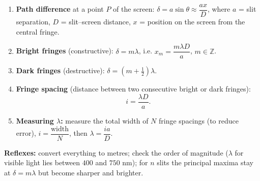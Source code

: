 \documentclass[11pt]{article}
\begin{document}
\begin{methode}
\begin{enumerate}
\item \textbf{Path difference} at a point $P$ of the screen: $\delta = a\sin\theta \approx \dfrac{ax}{D}$, where $a$ = slit separation, $D$ = slit--screen distance, $x$ = position on the screen from the central fringe.
\item \textbf{Bright fringes} (constructive): $\delta = m\lambda$, i.e. $x_m=\dfrac{m\lambda D}{a}$, $m\in\mathbb{Z}$.
\item \textbf{Dark fringes} (destructive): $\delta = \left(m+\tfrac12\right)\lambda$.
\item \textbf{Fringe spacing} (distance between two consecutive bright or dark fringes):
\[
i=\frac{\lambda D}{a}.
\]
\item \textbf{Measuring $\lambda$:} measure the total width of $N$ fringe spacings (to reduce error), $i=\dfrac{\text{width}}{N}$, then $\lambda=\dfrac{ia}{D}$.
\end{enumerate}
\textbf{Reflexes:} convert everything to metres; check the order of magnitude ($\lambda$ for visible light lies between $400$ and $750$ nm); for $n$ slits the principal maxima stay at $\delta=m\lambda$ but become sharper and brighter.
\end{methode}
\end{document}
